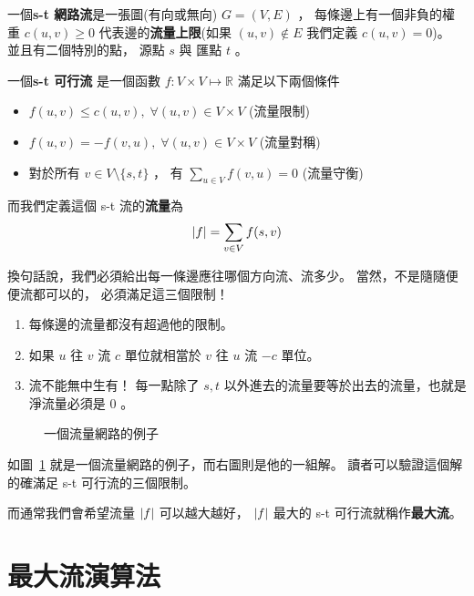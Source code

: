 \documentclass[a4paper,12pt]{book}
\begin{document}
\begin{theorem}[定義]
  一個{\bf s-t 網路流}是一張圖(有向或無向) $G = (V, E)$ ， 每條邊上有一個非負的權重
  $c(u, v) \geq 0$ 代表邊的{\bf 流量上限}(如果 $(u, v) \notin E$ 我們定義 $c(u, v) = 0$)。 
  並且有二個特別的點， 源點 $s$ 與 匯點 $t$ 。

  一個{\bf s-t 可行流} 是一個函數 $f : V \times V \mapsto \mathbb{R}$ 滿足以下兩個條件
  \begin{itemize}
    \item $f(u, v) \leq c(u, v), \; \forall (u, v) \in V \times V$\hfill
      (流量限制)  \listeqn \label{def:flow1}
    \item $f(u, v) = -f(v, u), \; \forall (u, v) \in V \times V$ \quad 
      (流量對稱) \listeqn \label{def:flow1}
    \item 對於所有 $v \in V \setminus \{s, t\}$ ， 有 $ \sum\limits_{u \in V} f(v, u) = 0 $ \quad
      (流量守衡) \listeqn \label{def:flow1}
  \end{itemize}

  而我們定義這個 s-t 流的{\bf 流量}為 \[ \lvert f \rvert = \sum_{v \in V} f(s, v) \]
\end{theorem}

換句話說，我們必須給出每一條邊應往哪個方向流、流多少。 當然，不是隨隨便便流都可以的，
必須滿足這三個限制！

\begin{enumerate}[label=(1.\arabic*) :]
  \item 每條邊的流量都沒有超過他的限制。
  \item 如果 $u$ 往 $v$ 流 $c$ 單位就相當於 $v$ 往 $u$ 流 $-c$ 單位。
  \item 流不能無中生有！ 每一點除了 $s, t$ 以外進去的流量要等於出去的流量，也就是
    淨流量必須是 $0$ 。
\end{enumerate}


\begin{figure}[H]
  \centering
  
  \caption{一個流量網路的例子}
  \label{fig:flow1}
\end{figure}

如圖~\ref{fig:flow1} 就是一個流量網路的例子，而右圖則是他的一組解。
讀者可以驗證這個解的確滿足 s-t 可行流的三個限制。

而通常我們會希望流量 $\lvert f \rvert$ 可以越大越好， $\lvert f \rvert$ 最大的
s-t 可行流就稱作{\bf 最大流}。

\section{最大流演算法}
\end{document}
